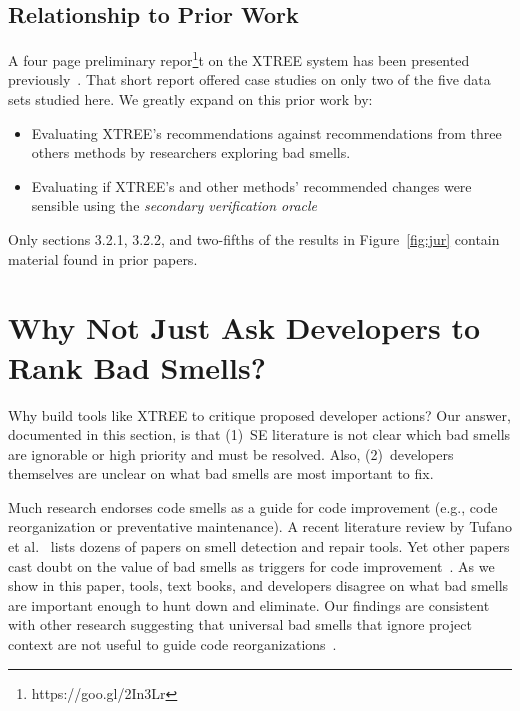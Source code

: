\documentclass[twocolumn,5p]{elsarticle}
\newcommand{\bi}{\begin{itemize}[leftmargin=0.4cm]}
\newcommand{\ei}{\end{itemize}}
\newcommand{\fig}[1]{Figure~\ref{fig:#1}}
\theoremstyle{break}
\begin{document}
	
	
	\subsection{Relationship to Prior Work }
	A four page preliminary repor\footnote{https://goo.gl/2In3Lr}t on the XTREE system has been presented previously~\cite{krishna2015actionable}. That short report offered case studies on only two  of
	the five data sets studied here. We greatly expand on this prior work by:
	\bi
	\item
	Evaluating XTREE's recommendations against recommendations from three others methods by researchers exploring bad smells.
	\item
	Evaluating if XTREE's and other methods' recommended changes were sensible using the {\em secondary verification oracle}
	\ei
	Only sections 3.2.1, 3.2.2, and two-fifths of the results in \fig{jur} contain material
	found in prior papers. 
	
	
	
	\section{Why Not Just Ask Developers to Rank Bad Smells?}\label{sect:prelim}
	
	Why build tools like XTREE to  critique proposed developer actions?
	Our answer, documented in this section, is that (1)~SE literature is not clear which bad smells are ignorable or  high priority and must be resolved.
	Also, (2)~developers themselves are unclear on what bad smells are most important to fix.
	
	
	Much research endorses code smells as a guide for
	code improvement (e.g., code reorganization or preventative maintenance). A recent literature review by Tufano et al.~\cite{Tufano2015}  
	lists dozens of papers on smell detection and repair tools. 
	Yet
	other papers cast doubt on the value of bad smells
	as triggers for code improvement~\cite{Mantyla2004,Yamashita2013,Sjoberg2013}. 
	As we show in this paper,  
	tools, text books, and developers disagree on what bad smells
	are important enough to hunt down and eliminate. Our findings
	are consistent with other research suggesting that universal bad
	smells that ignore project context are not useful to guide code reorganizations~\cite{Mantyla2004,Yamashita2013,Sjoberg2013}.
	
\end{document}
